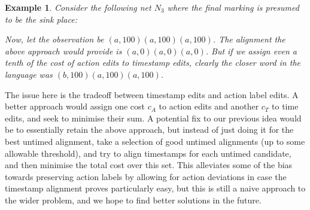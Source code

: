 \documentclass[conference]{IEEEtran}
\newcommand\eye{\ensurestackMath{\stackinset{c}{}{c}{-.33pt}%
		{\bullet}{\bigcirc}}}
\newtheorem{example}{Example}
\begin{document}
\begin{example}
	Consider the following net $N_3$ where the final marking is presumed to be the sink place: \\
	\adjustbox{scale=0.8}{
	\begin{tikzcd}
		\eye_I & {\fbox{a}} & \bigcirc & {\fbox{a}} & \bigcirc & {\fbox{a}} &\bigcirc_f \\
		& {\fbox{b}} & \bigcirc & {\fbox{a}} & \bigcirc & {\fbox{a}} \\
		\arrow[from=1-1, to=1-2]
		\arrow[curve={height=12pt}, from=1-1, to=2-2]
		\arrow[from=1-2, to=1-3]
		\arrow[from=1-3, to=1-4]
		\arrow[from=1-4, to=1-5]
		\arrow[from=1-5, to=1-6]
		\arrow[from=1-6, to=1-7]
		\arrow[from=2-2, to=2-3]
		\arrow[from=2-3, to=2-4]
		\arrow[from=2-4, to=2-5]
		\arrow[from=2-5, to=2-6]
		\arrow[curve={height=12pt}, from=2-6, to=1-7]
		\arrow["{[0,0]}"{description, pos=0.1}, draw=white, from=1-2, to=2-2]
		\arrow["{[0,0]}"{description, pos=0.1}, draw=white, from=1-4, to=2-4]
		\arrow["{[0,0]}"{description, pos=0.1}, draw=white, from=1-6, to=2-6]
		\arrow["{[100,100]}"{description, pos=0.1}, draw=white, from=2-2, to=1-2]
		\arrow["{[100,100]}"{description, pos=0.1}, draw=white, from=2-4, to=1-4]
		\arrow["{[100,100]}"{description, pos=0.1}, draw=white, from=2-6, to=1-6]
	\end{tikzcd}}

\vspace{-15pt}

	Now, let the observation be ${(a, 100)(a, 100)(a, 100)}$. 
	The alignment the above approach would provide is $ (a, 0)(a, 0)(a, 0)$. 
	But if we assign even a tenth of the cost of action edits to timestamp edits, clearly the closer word in the language was $(b, 100)(a, 100)(a, 100)$. 
\end{example}

The issue here is the tradeoff between timestamp edits and action label edits. A better approach would assign one cost $c_A$ to action edits and another $c_T$ to time edits, and seek to minimise their sum. A potential fix to our previous idea would be to essentially retain the above approach, but instead of just doing it for the best untimed alignment, take a selection of good untimed alignments (up to some allowable threshold), and try to align timestamps for each untimed candidate, and then minimise the total cost over this set. This alleviates some of the bias towards preserving action labels by allowing for action deviations in case the timestamp alignment proves particularly easy, but this is still a naive approach to the wider problem, and we hope to find better solutions in the future. 
\end{document}
